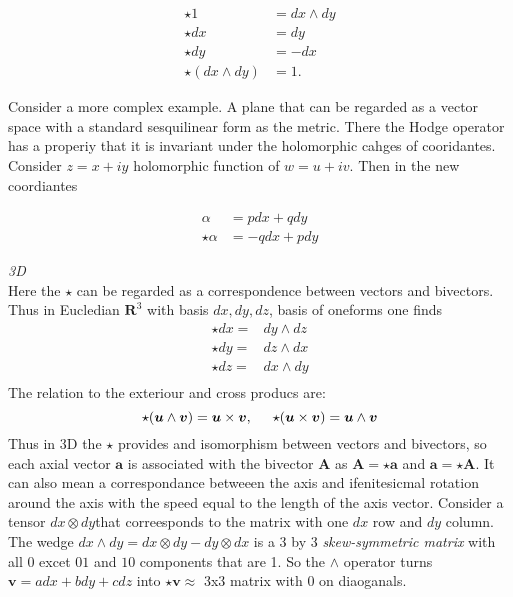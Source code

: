 \documentclass[11pt,a4paper,headinclude=true,DIV=14,BCOR=8mm,chapterprefix,listof=totoc,twoside,openright,abstracton]{scrbook}
\begin{document}
\begin{sidenote}
    \begin{align}
        \star 1 &= dx \wedge dy \\
        \star dx &= dy \\
        \star dy &= -dx \\
        \star(dx \wedge dy) &= 1.
    \end{align}
    
    Consider a more complex example. A plane that can be regarded as a vector space with a standard sesquilinear form as the metric. There the Hodge operator has a properiy that it is invariant under the holomorphic cahges of cooridantes. Consider $z = x + iy$ holomorphic function of $w=u + iv$. Then in the new coordiantes 
    
    \begin{align}
        \alpha &= pdx +qdy \\
        \star \alpha &= -q dx + p dy
    \end{align}
    
    \textit{3D} \\
    Here the $\star$ can be regarded as a correspondence between vectors and bivectors. Thus in Eucledian $\boldsymbol{R}^3$ with basis $dx,dy,dz$, basis of oneforms one finds
    \begin{align}
        \star dx =& dy\wedge dz \\
        \star dy =& dz\wedge dx \\
        \star dz =& dx \wedge dy \\
    \end{align}
    The relation to the exteriour and cross producs are:
    \begin{equation}
        \star(\boldsymbol{u}\wedge\boldsymbol{v})=\boldsymbol{u}\times\boldsymbol{v}, \hspace{5mm}\star(\boldsymbol{u}\times\boldsymbol{v}) = \boldsymbol{u}\wedge\boldsymbol{v}
    \end{equation}
    Thus in 3D the $\star$ provides and isomorphism between vectors and bivectors, so each axial vector $\boldsymbol{a}$ is associated with the bivector $\boldsymbol{A}$ as $\boldsymbol{A} = \star\boldsymbol{a}$ and $\boldsymbol{a} = \star\boldsymbol{A}$. It can also mean a correspondance betweeen the axis and ifenitesicmal rotation around the axis with the speed equal to the length of the axis vector.
    Consider a tensor $dx \otimes dy$that correesponds to the matrix with one $dx$ row and $dy$ column. The wedge $dx\wedge dy = dx\otimes dy - dy\otimes dx$ is a 3 by 3 \textit{skew-symmetric matrix} with all 0 excet $01$ and $10$ components that are 1. So the $\wedge$ operator turns $\boldsymbol{v} = adx + bdy + cdz$ into $\star\boldsymbol{v}\approx$ 3x3 matrix with 0 on diaoganals. \\
    

\end{sidenote}
\end{document}
